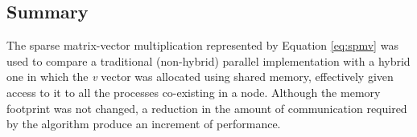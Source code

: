 \subsection*{Summary}

The sparse matrix-vector multiplication represented by Equation \ref{eq:spmv} was used to compare a traditional (non-hybrid) parallel implementation with a hybrid one in which the \emph{v} vector was allocated using shared memory, effectively given access to it to all the processes co-existing in a node. Although the memory footprint was not changed, a reduction in the amount of communication required by the algorithm produce an increment of performance.



